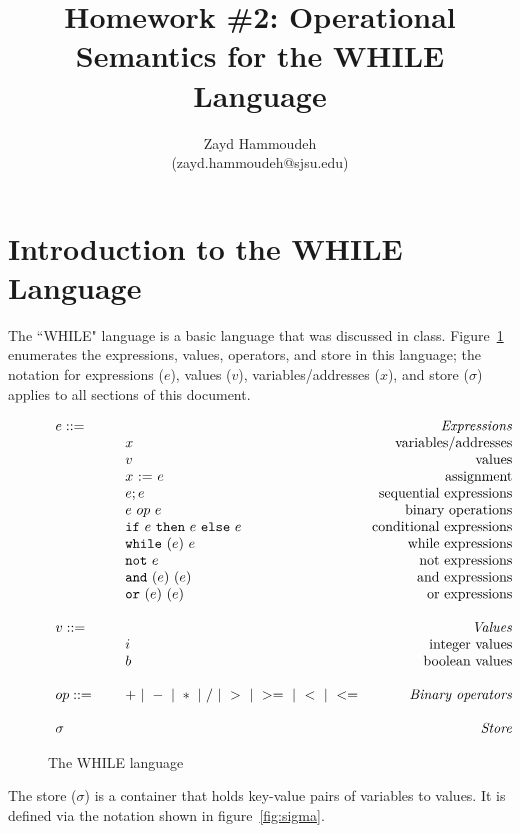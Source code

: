 \documentclass{article}
\title{Homework \#2: Operational Semantics for the WHILE Language}
\author{
  Zayd Hammoudeh \\
  (zayd.hammoudeh@sjsu.edu)
  }
\date{}
\newcommand{\rel}[1]{ \mbox{\sc [#1]} }
\newcommand{\mydefhead}[2]{\multicolumn{2}{l}{{#1}}&\mbox{\emph{#2}}\\}
\newcommand{\mydefcase}[2]{\qquad\qquad& #1 &\mbox{#2}\\}
\newcommand{\assign}[2]{#1~{:=}~#2}
\newcommand{\ife}[3]{\mbox{\tt if}~{#1}~\mbox{\tt then}~{#2}~\mbox{\tt else}~{#3}}
\newcommand{\whilee}[2]{\mbox{\tt while}~(#1)~#2}
\newcommand{\note}[1]{\mbox{\tt not}~#1}
\newcommand{\ande}[2]{\mbox{\tt and}~(#1)~(#2)}
\newcommand{\ore}[2]{\mbox{\tt or}~(#1)~(#2)}
\begin{document}
\maketitle

\section{Introduction to the WHILE Language}

The ``WHILE" language is a basic language that was discussed in class.  Figure~\ref{fig:lang} enumerates the expressions, values, operators, and store in this language; the notation for expressions ($e$), values ($v$), variables/addresses ($x$), and store ($\sigma$) applies to all sections of this document.

\newcommand{\ssrule}[3]{
  \rel{#1} &
  \frac{\strut\begin{array}{@{}c@{}} #2 \end{array}}
       {\strut\begin{array}{@{}c@{}} #3 \end{array}}
   \\~\\
}
\newcommand{\sstep}[4]{{#1},{#2} \rightarrow {#3},{#4}}
\newcommand{\sstepraw}[4]{{#1},{#2} \rightarrow {#3},{#4}}
\begin{figure}[H]
\caption{The WHILE language}
\label{fig:lang}
\[
\begin{array}{llr}
  \mydefhead{e ::=\qquad\qquad\qquad\qquad}{Expressions}
  \mydefcase{x}{variables/addresses}
  \mydefcase{v}{values}
  \mydefcase{\assign x e}{assignment}
  \mydefcase{e; e}{sequential expressions}
  \mydefcase{e ~op~ e}{binary operations}
  \mydefcase{\ife e e e}{conditional expressions}
  \mydefcase{\whilee e e}{while expressions}
  \mydefcase{\note e}{not expressions}
  \mydefcase{\ande e e}{and expressions}
  \mydefcase{\ore e e}{or expressions}
  \\
  \mydefhead{v ::=\qquad\qquad\qquad\qquad}{Values}
  \mydefcase{i}{integer values}
  \mydefcase{b}{boolean values}
  \\
  op ::= & + ~|~ - ~|~ * ~|~ / ~|~ > ~|~ >= ~|~ < ~|~ <=  & \mbox{\emph{Binary operators}} 
  \\
  \\
  \mydefhead{\sigma}{Store} 
\end{array}
\]
\end{figure}

The store ($\sigma$) is a container that holds key-value pairs of variables to values.  It is defined via the notation shown in figure~\ref{fig:sigma}.
\end{document}
